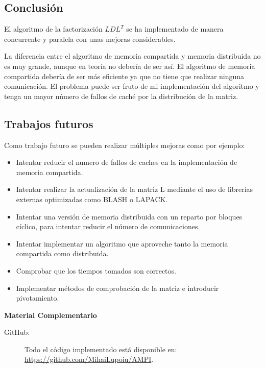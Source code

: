 \documentclass[12pt]{article}
\begin{document}
\subsection{Conclusión}

  El algoritmo de la factorización $LDL^T$ se ha implementado de manera concurrente y paralela con unas mejoras considerables.
  
  La diferencia entre el algoritmo de memoria compartida y memoria distribuida no es muy grande, aunque en teoría no debería de ser así. El algoritmo de memoria compartida debería de ser más eficiente ya que no tiene que realizar ninguna comunicación. El problema puede ser fruto de mi implementación del algoritmo y tenga un mayor número de fallos de caché por la distribución de la matriz.
  
\subsection{Trabajos futuros}

	Como trabajo futuro se pueden realizar múltiples mejoras como por ejemplo:
    
\begin{itemize}
\item Intentar reducir el numero de fallos de caches en la implementación de memoria compartida.
\item Intentar realizar la actualización de la matriz L mediante el uso de librerías externas optimizadas como BLASH o LAPACK.
\item Intentar una versión de memoria distribuida con un reparto por bloques cíclico, para intentar reducir el número de comunicaciones.
\item Intentar implementar un algoritmo que aproveche tanto la memoria compartida como distribuida.
\item Comprobar que los tiempos tomados son correctos.
\item Implementar métodos de comprobación de la matriz e introducir pivotamiento.
\end{itemize}
    
\bigskip
\begin{center}
{\large\bf Material Complementario}
\end{center}

\begin{description}

\item[GitHub:] Todo el código implementado está disponible en: {\url{https://github.com/MihaiLupoiu/AMPI}}.

\end{description}
\end{document}
